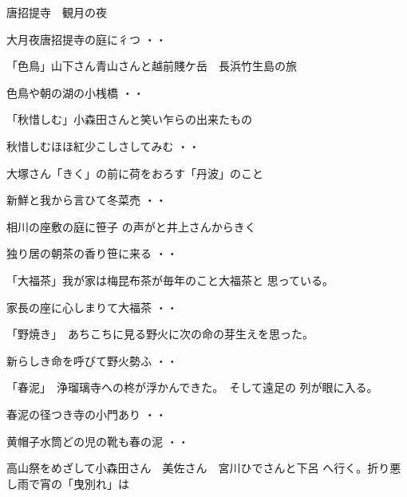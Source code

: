 \documentclass[b5paper]{tbook}
\begin{document}
\vspace{0.6cm}
唐招提寺　観月の夜
\begin{shiika}大月夜唐招提寺の庭に彳つ
\hfill{・・}\end{shiika}
\vspace{0.6cm}
「色鳥」山下さん青山さんと越前賤ケ岳　長浜竹生島の旅
\begin{shiika}色鳥や朝の湖の小桟橋
\hfill{・・}\end{shiika}
\vspace{0.6cm}
「秋惜しむ」小森田さんと笑い乍らの出来たもの
\begin{shiika}秋惜しむほほ紅少こしさしてみむ
\hfill{・・}\end{shiika}
\vspace{0.6cm}
大塚さん「きく」の前に荷をおろす「丹波」のこと
\begin{shiika}新鮮と我から言ひて冬菜売
\hfill{・・}\end{shiika}
\vspace{0.6cm}
相川の座敷の庭に笹子
の声がと井上さんからきく
\begin{shiika}独り居の朝茶の香り笹に来る
\hfill{・・}\end{shiika}
\vspace{0.6cm}
「大福茶」我が家は梅昆布茶が毎年のこと大福茶と
思っている。
\begin{shiika}家長の座に心しまりて大福茶
\hfill{・・}\end{shiika}
\vspace{0.6cm}
「野焼き」　あちこちに見る野火に次の命の芽生えを思った。
\begin{shiika}新らしき命を呼びて野火勢ふ
\hfill{・・}\end{shiika}
\vspace{0.6cm}
「春泥」　浄瑠璃寺への柊が浮かんできた。　そして遠足の
列が眼に入る。
\begin{shiika}春泥の径つき寺の小門あり
\hfill{・・}\end{shiika}
\begin{shiika}黄帽子水筒どの児の靴も春の泥
\hfill{・・}\end{shiika}
\vspace{0.6cm}
高山祭をめざして小森田さん　美佐さん　宮川ひでさんと下呂
へ行く。折り悪し雨で宵の「曳別れ」は
\end{document}
